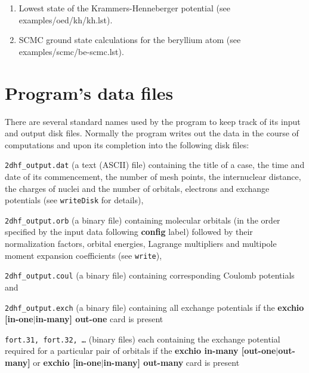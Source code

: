 \documentclass[12pt,a4paper]{article}
\begin{document}
\begin{enumerate}





\newpage

\item Lowest state of the Krammers-Henneberger potential (see
  examples/\-oed/\-kh/\-kh.lst).



\item SCMC ground state calculations for the beryllium atom (see
  examples/\-scmc/\-be-scmc.lst).



\end{enumerate}

\newpage

\section{Program's data files} 

There are several standard names used by the program to keep track of its input and output
disk files. Normally the program writes out the data in the course of computations and
upon its completion into the following disk files:
\begin{description} 

\item \texttt{2dhf\_output.dat} (a text (ASCII) file) containing the title of a case, the
  time and date of its commencement, the number of mesh points, the internuclear distance,
  the charges of nuclei and the number of orbitals, electrons and exchange potentials (see
  \texttt{writeDisk} for details),

\item \texttt{2dhf\_output.orb} (a binary file) containing molecular orbitals (in the
  order specified by the input data following \textbf{config} label) followed by their
  normalization factors, orbital energies, Lagrange multipliers and multipole moment
  expansion coefficients (see \texttt{write\*}),

\item \texttt{2dhf\_output.coul} (a binary file) containing
  corresponding Coulomb potentials and

\item \texttt{2dhf\_output.exch} (a binary file) containing all exchange potentials if the
  \textbf{exchio [in-one$|$in-many] out-one} card is present

\item \texttt{fort.31, fort.32, \ldots} (binary files) each containing the exchange
  potential required for a particular pair of orbitals if the \textbf{exchio in-many
    [out-one$|$out-many]} or \textbf{exchio [in-one$|$in-many] out-many} card is present
\end{description}
\end{document}
